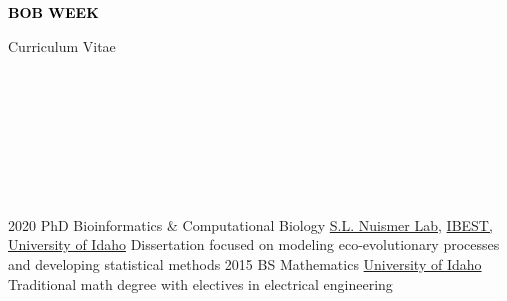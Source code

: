\documentclass[9pt]{developercv} %
\begin{document}

\begin{minipage}[t]{0.5\textwidth} 
	\vspace{-\baselineskip} %
	
	{ \fontsize{16}{20} \textcolor{black}{\textbf{\MakeUppercase{Bob Week}}}} %
	
	\vspace{6pt}
	
	{\Large Curriculum Vitae} %
\end{minipage}
\hfill
\begin{minipage}[t]{0.2\textwidth} %
	\vspace{-\baselineskip} %
	
	\\
    \\
    \\
	
\end{minipage}
\begin{minipage}[t]{0.27\textwidth} %
	\vspace{-\baselineskip} %
	
	\\
    \\
    \\
\end{minipage}

\vspace{-0 pt}
\begin{entrylist}
    \entry
		{2020}
		{PhD Bioinformatics \& Computational Biology}
		{\href{https://www.leeef.org/}{S.L. Nuismer Lab}, \href{https://www.iids.uidaho.edu/about.php}{IBEST, University of Idaho}}
		{Dissertation focused on modeling eco-evolutionary processes and developing statistical methods}
    \entry
		{2015}
		{BS Mathematics}
		{\href{https://www.uidaho.edu/sci/mathstat}{University of Idaho}}
		{Traditional math degree with electives in electrical engineering}
\end{entrylist}
\end{document}
